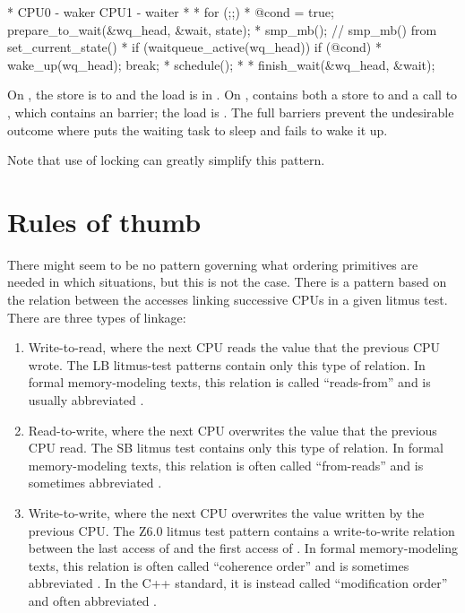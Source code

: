 \begin{VerbatimU}
* CPU0 - waker                    CPU1 - waiter
*
*                                 for (;;) {
* @cond = true;                     prepare_to_wait(&wq_head, &wait, state);
* smp_mb();                         // smp_mb() from set_current_state()
* if (waitqueue_active(wq_head))         if (@cond)
*   wake_up(wq_head);                      break;
*                                   schedule();
*                                 }
*                                 finish_wait(&wq_head, &wait);
\end{VerbatimU}

On , the store is to  and the load is in .
On ,  contains both a store to 
and a call to , which contains an  barrier;
the load is .
The full barriers prevent the undesirable outcome where  puts the
waiting task to sleep and  fails to wake it up.

Note that use of locking can greatly simplify this pattern.


\section{Rules of thumb}

There might seem to be no pattern governing what ordering primitives are
needed in which situations, but this is not the case.
There is a pattern based on the relation between the accesses linking
successive CPUs in a given litmus test.
There are three types of linkage:

\begin{enumerate}
\item	Write-to-read, where the next CPU reads the value that the
	previous CPU wrote.
	The LB litmus-test patterns contain only this type of relation.
	In formal memory-modeling texts, this relation is called
        ``reads-from'' and is usually abbreviated .

\item	Read-to-write, where the next CPU overwrites the value that the
	previous CPU read.
	The SB litmus test contains only this type of relation.
	In formal memory-modeling texts, this relation is often called
	``from-reads'' and is sometimes abbreviated .

\item	Write-to-write, where the next CPU overwrites the value written
	by the previous CPU\@.
	The Z6.0 litmus test pattern contains a write-to-write relation
	between the last access of  and the first access of
	.
	In formal memory-modeling texts, this relation is often called
	``coherence order'' and is sometimes abbreviated .
	In the C++ standard, it is instead called ``modification order''
	and often abbreviated .
\end{enumerate}

